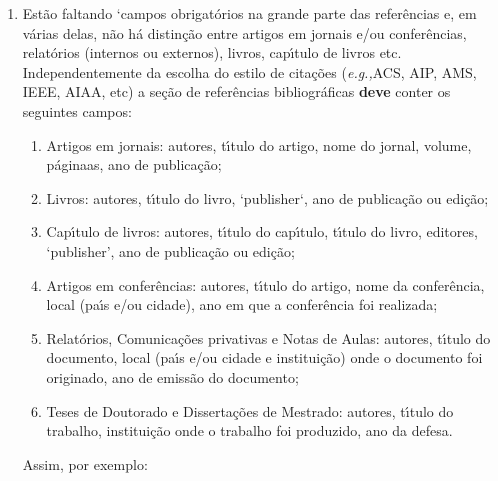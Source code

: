 \documentclass[14pt,twoside]{report}
\newcommand{\eg}{{\it e.g.,}}
\begin{document}
\begin{enumerate}
\begin{enumerate}
        \item Est\~ao faltando `campos obrigat\'orios na grande parte das refer\^encias e, em v\'arias delas, n\~ao h\'a distin\c{c}\~ao entre artigos em jornais e/ou confer\^encias, relat\'orios (internos ou externos), livros, cap\'{\i}tulo de livros etc. Independentemente da escolha do estilo de cita\c{c}\~oes (\eg ACS, AIP, AMS, IEEE, AIAA, etc) a se\c{c}\~ao de refer\^encias bibliogr\'aficas {\bf deve} conter os seguintes campos: 
                      \begin{enumerate}
                         \item Artigos em jornais: autores, t\'{\i}tulo do artigo, nome do jornal, volume, p\'aginaas, ano de publica\c{c}\~ao;
                         \item Livros: autores, t\'{\i}tulo do livro, `publisher`, ano de publica\c{c}\~ao ou edi\c{c}\~ao;
                         \item Cap\'{\i}tulo de livros: autores, t\'{\i}tulo do cap\'{\i}tulo, t\'{\i}tulo do livro, editores, `publisher', ano de publica\c{c}\~ao ou edi\c{c}\~ao;
                         \item Artigos em confer\^encias: autores, t\'{\i}tulo do artigo, nome da confer\^encia, local (pa\'{\i}s e/ou cidade), ano em que a confer\^encia foi realizada;
                         \item Relat\'orios, Comunica\c{c}\~oes privativas e Notas de Aulas: autores, t\'{\i}tulo do documento, local (pa\'{\i}s e/ou cidade e institui\c{c}\~ao) onde o documento foi originado, ano de emiss\~ao do documento; 
                         \item Teses de Doutorado e Disserta\c{c}\~oes de Mestrado: autores, t\'{\i}tulo do trabalho, institui\c{c}\~ao onde o trabalho foi produzido, ano da defesa.
                      \end{enumerate}  
                      Assim, por exemplo:
%
                \end{enumerate}

                \end{enumerate} 
\end{document}
